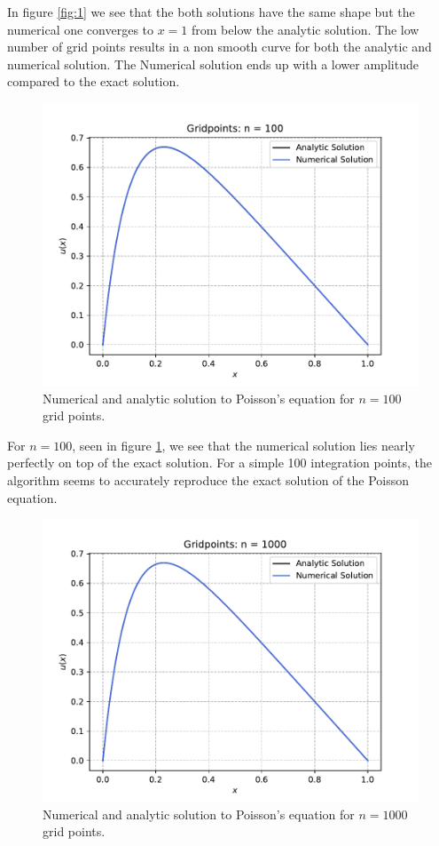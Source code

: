 \documentclass[a4paper,10pt]{article}
\begin{document}
In figure \ref{fig:1} we see that the both solutions have the same shape but the numerical one converges to $x=1$ from below the analytic solution. The low number of grid points results in a non smooth curve for both the analytic and numerical solution. The Numerical solution ends up with a lower amplitude compared to the exact solution.

\begin{figure}[h]
  \centering
  \includegraphics[width=0.9\linewidth]{figures/fig_100_b.pdf}
  \caption{Numerical and analytic solution to Poisson's equation for $n = 100$ grid points.}
  \label{fig:2}
\end{figure}

For $n = 100$, seen in figure \ref{fig:2}, we see that the numerical solution lies nearly perfectly on top of the exact solution. For a simple 100 integration points, the algorithm seems to accurately reproduce the exact solution of the Poisson equation.


\begin{figure}[h]
  \centering
  \includegraphics[width=0.9\linewidth]{figures/fig_1000_b.pdf}
  \caption{Numerical and analytic solution to Poisson's equation for $n = 1000$ grid points.}
  \label{fig:3}
\end{figure}
\end{document}
